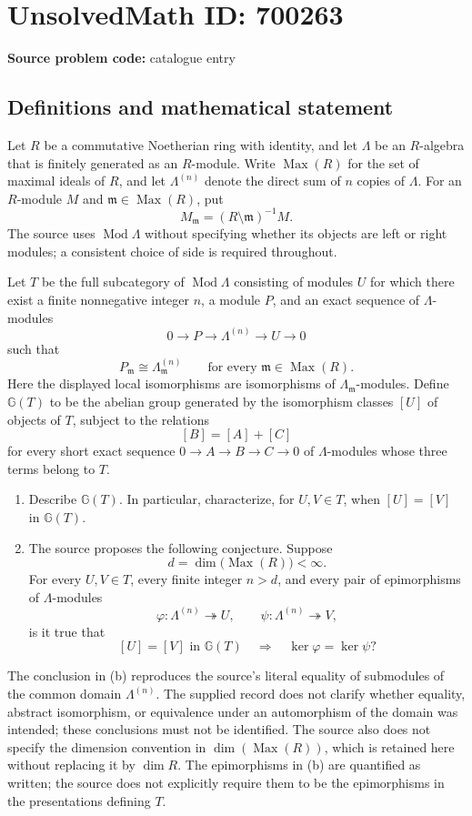 \documentclass[11pt]{article}
\begin{document}
\section*{UnsolvedMath ID: 700263}
\textbf{Source problem code:} catalogue entry
\subsection{Definitions and mathematical statement}
Let \(R\) be a commutative Noetherian ring with identity, and let \(\Lambda\) be an \(R\)-algebra that is finitely generated as an \(R\)-module. Write \(\operatorname{Max}(R)\) for the set of maximal ideals of \(R\), and let \(\Lambda^{(n)}\) denote the direct sum of \(n\) copies of \(\Lambda\). For an \(R\)-module \(M\) and \(\mathfrak m\in\operatorname{Max}(R)\), put
\[
M_{\mathfrak m}=(R\setminus\mathfrak m)^{-1}M.
\]
The source uses \(\operatorname{Mod}\Lambda\) without specifying whether its objects are left or right modules; a consistent choice of side is required throughout.

Let \(T\) be the full subcategory of \(\operatorname{Mod}\Lambda\) consisting of modules \(U\) for which there exist a finite nonnegative integer \(n\), a module \(P\), and an exact sequence of \(\Lambda\)-modules
\[
0\longrightarrow P\longrightarrow\Lambda^{(n)}\longrightarrow U\longrightarrow0
\]
such that
\[
P_{\mathfrak m}\cong\Lambda_{\mathfrak m}^{(n)}
\qquad\text{for every }\mathfrak m\in\operatorname{Max}(R).
\]
Here the displayed local isomorphisms are isomorphisms of \(\Lambda_{\mathfrak m}\)-modules. Define \(\mathbb G(T)\) to be the abelian group generated by the isomorphism classes \([U]\) of objects of \(T\), subject to the relations
\[
[B]=[A]+[C]
\]
for every short exact sequence \(0\to A\to B\to C\to0\) of \(\Lambda\)-modules whose three terms belong to \(T\).

\begin{enumerate}
\item[(a)] Describe \(\mathbb G(T)\). In particular, characterize, for \(U,V\in T\), when \([U]=[V]\) in \(\mathbb G(T)\).
\item[(b)] The source proposes the following conjecture. Suppose
\[
d=\dim\bigl(\operatorname{Max}(R)\bigr)<\infty.
\]
For every \(U,V\in T\), every finite integer \(n>d\), and every pair of epimorphisms of \(\Lambda\)-modules
\[
\varphi:\Lambda^{(n)}\twoheadrightarrow U,
\qquad
\psi:\Lambda^{(n)}\twoheadrightarrow V,
\]
is it true that
\[
[U]=[V]\text{ in }\mathbb G(T)
\quad\Longrightarrow\quad
\ker\varphi=\ker\psi?
\]
\end{enumerate}
The conclusion in (b) reproduces the source's literal equality of submodules of the common domain \(\Lambda^{(n)}\). The supplied record does not clarify whether equality, abstract isomorphism, or equivalence under an automorphism of the domain was intended; these conclusions must not be identified. The source also does not specify the dimension convention in \(\dim(\operatorname{Max}(R))\), which is retained here without replacing it by \(\dim R\). The epimorphisms in (b) are quantified as written; the source does not explicitly require them to be the epimorphisms in the presentations defining \(T\).
\end{document}
